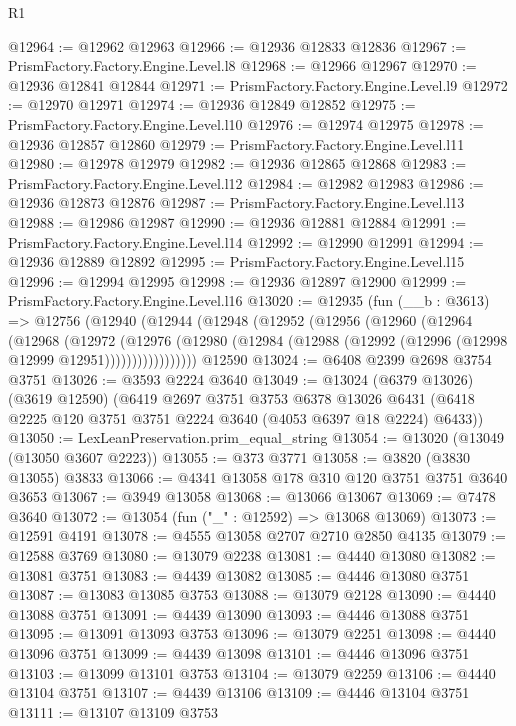 \begin{lexlean}{R1}
\begin{coremodule}
@12964 := @12962 @12963
@12966 := @12936 @12833 @12836
@12967 := PrismFactory.Factory.Engine.Level.l8
@12968 := @12966 @12967
@12970 := @12936 @12841 @12844
@12971 := PrismFactory.Factory.Engine.Level.l9
@12972 := @12970 @12971
@12974 := @12936 @12849 @12852
@12975 := PrismFactory.Factory.Engine.Level.l10
@12976 := @12974 @12975
@12978 := @12936 @12857 @12860
@12979 := PrismFactory.Factory.Engine.Level.l11
@12980 := @12978 @12979
@12982 := @12936 @12865 @12868
@12983 := PrismFactory.Factory.Engine.Level.l12
@12984 := @12982 @12983
@12986 := @12936 @12873 @12876
@12987 := PrismFactory.Factory.Engine.Level.l13
@12988 := @12986 @12987
@12990 := @12936 @12881 @12884
@12991 := PrismFactory.Factory.Engine.Level.l14
@12992 := @12990 @12991
@12994 := @12936 @12889 @12892
@12995 := PrismFactory.Factory.Engine.Level.l15
@12996 := @12994 @12995
@12998 := @12936 @12897 @12900
@12999 := PrismFactory.Factory.Engine.Level.l16
@13020 := @12935
    (fun (__b : @3613) =>
    @12756
      (@12940
        (@12944
          (@12948
            (@12952
              (@12956
                (@12960
                  (@12964
                    (@12968
                      (@12972
                        (@12976
                          (@12980
                            (@12984 (@12988 (@12992 (@12996 (@12998 @12999 @12951)))))))))))))))))
    @12590
@13024 := @6408 @2399 @2698 @3754 @3751
@13026 := @3593 @2224 @3640
@13049 := @13024
    (@6379 @13026)
    (@3619 @12590)
    (@6419
      @2697
      @3751
      @3753
      @6378
      @13026
      @6431
      (@6418 @2225 @120 @3751 @3751 @2224 @3640 (@4053 @6397 @18 @2224) @6433))
@13050 := LexLeanPreservation.prim_equal_string
@13054 := @13020 (@13049 (@13050 @3607 @2223))
@13055 := @373 @3771
@13058 := @3820 (@3830 @13055) @3833
@13066 := @4341 @13058 @178 @310 @120 @3751 @3751 @3640 @3653
@13067 := @3949 @13058
@13068 := @13066 @13067
@13069 := @7478 @3640
@13072 := @13054 (fun ("_" : @12592) => @13068 @13069)
@13073 := @12591 @4191
@13078 := @4555 @13058 @2707 @2710 @2850 @4135
@13079 := @12588 @3769
@13080 := @13079 @2238
@13081 := @4440 @13080
@13082 := @13081 @3751
@13083 := @4439 @13082
@13085 := @4446 @13080 @3751
@13087 := @13083 @13085 @3753
@13088 := @13079 @2128
@13090 := @4440 @13088 @3751
@13091 := @4439 @13090
@13093 := @4446 @13088 @3751
@13095 := @13091 @13093 @3753
@13096 := @13079 @2251
@13098 := @4440 @13096 @3751
@13099 := @4439 @13098
@13101 := @4446 @13096 @3751
@13103 := @13099 @13101 @3753
@13104 := @13079 @2259
@13106 := @4440 @13104 @3751
@13107 := @4439 @13106
@13109 := @4446 @13104 @3751
@13111 := @13107 @13109 @3753

\end{coremodule}
\end{lexlean}
